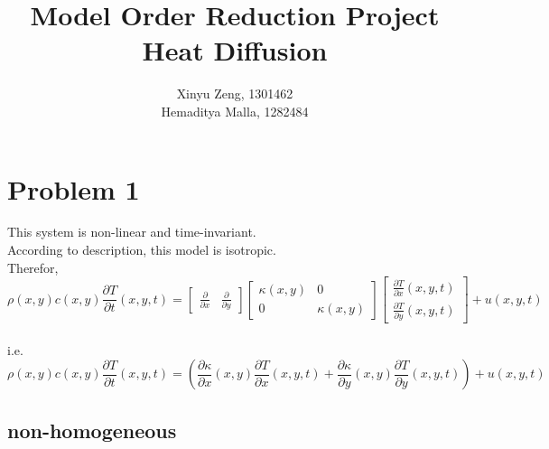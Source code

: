 \documentclass[12pt]{article}
\begin{document}
 
 
\title{%
  Model Order Reduction Project \\
  \large Heat Diffusion} 
 
 \author{ %
Xinyu Zeng, 1301462 \\
Hemaditya Malla, 1282484
}
 
\maketitle
\tableofcontents
\pagebreak

\section*{Problem 1}

This system is non-linear and time-invariant.\\
According to description, this model is isotropic.\\ Therefor,
\begin{equation}
\rho (x,y)c(x,y)\frac {\partial T} {\partial t}(x,y,t)=
\begin{bmatrix}
\frac {\partial} {\partial x} & \frac {\partial} {\partial y}
\end{bmatrix}
\begin{bmatrix}
\kappa(x,y) & 0\\
0 & \kappa(x,y) 
\end{bmatrix}
\begin{bmatrix}
\frac {\partial T} {\partial x}(x,y,t)\\
\frac {\partial T} {\partial y}(x,y,t)
\end{bmatrix}
+u(x,y,t)
\end{equation}\\
i.e.
\begin{equation}
\rho (x,y)c(x,y)\frac {\partial T} {\partial t}(x,y,t)=
(\frac {\partial \kappa} {\partial x}(x,y) \frac {\partial T} {\partial x}(x,y,t)+\frac {\partial \kappa} {\partial y}(x,y) \frac {\partial T} {\partial y}(x,y,t))+u(x,y,t)
\end{equation}

\subsection*{non-homogeneous} 
\end{document}
